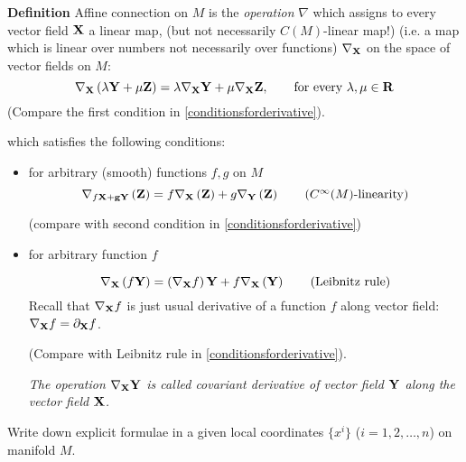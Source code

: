 \documentclass[12pt]{article}
\theoremstyle{theorem}
\numberwithin{equation}{section}
\begin{document}
{\bf Definition} Affine connection on $M$ is the {\it operation} $\nabla$
which assigns to every vector field $\bf X$ a linear map, (but not necessarily $C(M)$-linear map!)
(i.e. a map which is linear over numbers not necessarily over functions)
 $\nabla_{\bf X}$
 on the space  of
vector fields on $M$:
\begin{equation}\label{defofconnection}
  \nabla_{\bf X}\left(\lambda{\bf Y}+\mu{\bf Z}\right)=
   \lambda\nabla_{\bf X}{\bf Y}+\mu\nabla_{\bf X}{\bf Z},\qquad
   \hbox{for every $\lambda,\mu\in {\bf R}$}
\end{equation}
(Compare the first condition in \eqref{conditionsforderivative}).

\noindent which satisfies the following conditions:


\begin{itemize}

\item

for arbitrary (smooth) functions $f,g$ on $M$
\begin{equation}\label{linearityonfunctions}
  \nabla_{f\bf X+g\bf Y}\left({\bf Z}\right)=
   f\nabla_{\bf X}\left({\bf Z}\right)+
   g\nabla_{\bf Y}\left({\bf Z}\right)\qquad
   \hbox {($C^\infty(M)$-linearity)}
\end{equation}


(compare with second condition in \eqref{conditionsforderivative})

\item
for arbitrary function $f$


\begin{equation}\label{leibnitzrule}
  \nabla_{\bf X} \left( f\bf Y \right)=
   \left(\nabla_{\bf X}f\right){\bf Y}+
   f\nabla_{\bf X}\left({\bf Y}\right)\qquad
   \hbox {(Leibnitz rule)}
\end{equation}
Recall that $\nabla_{\bf X} f$ is just usual derivative of a function $f$ along vector field:
$\nabla_{\bf X} f=\partial_{\bf X} f$.

(Compare with Leibnitz rule in \eqref{conditionsforderivative}).



{\it The operation $\nabla_{\bf X}{\bf Y}$ is called  covariant derivative
of vector field ${\bf Y}$ along the vector field ${\bf X}$.}


\end{itemize}



  Write down explicit formulae in a given local coordinates $\{x^i\}$ ($i=1,2,\dots,n$) on manifold $M$.
\end{document}
